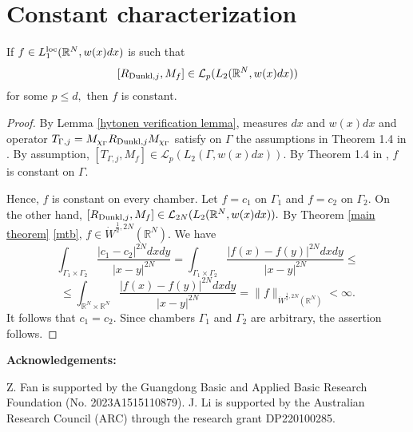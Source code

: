 \documentclass{amsart}
\numberwithin{equation}{section}
\begin{document}
\section{Constant characterization}
\setcounter{equation}{0}

\begin{theorem} If $f\in L_1^{{\rm loc}}(\mathbb{R}^N,w(x)dx)$ is such that $$[R_{{\rm Dunkl},j},M_f]\in\mathcal{L}_p(L_2(\mathbb{R}^N,w(x)dx))$$
for some $p\leq d,$ then $f$ is constant.
\end{theorem}
\begin{proof} By Lemma \ref{hytonen verification lemma}, measures $dx$ and $w(x)dx$ and operator $T_{\Gamma,j}=M_{\chi_{\Gamma}}R_{{\rm Dunkl},j}M_{\chi_{\Gamma}}$ satisfy {\color{red} on $\Gamma$} the assumptions in Theorem 1.4 in \cite{Hytonen-new}. By assumption, $[T_{\Gamma,j},M_f]\in\mathcal{L}_p(L_2(\Gamma,w(x)dx)).$ By Theorem 1.4 in \cite{Hytonen-new}, $f$ is constant on $\Gamma.$

Hence, $f$ is constant on every chamber. Let $f=c_1$ on $\Gamma_1$ and $f=c_2$ on $\Gamma_2.$ On the other hand, $[R_{{\rm Dunkl},j},M_f]\in\mathcal{L}_{2N}(L_2(\mathbb{R}^N,w(x)dx)).$ By Theorem \ref{main theorem} \eqref{mtb}, $f\in\dot{W}^{\frac12,2N}(\mathbb{R}^N).$  We have
$$\int_{\Gamma_1\times\Gamma_2}\frac{|c_1-c_2|^{2N}dxdy}{|x-y|^{2N}}=\int_{\Gamma_1\times\Gamma_2}\frac{|f(x)-f(y)|^{2N}dxdy}{|x-y|^{2N}}\leq$$
$$\leq\int_{\mathbb{R}^N\times\mathbb{R}^N}\frac{|f(x)-f(y)|^{2N}dxdy}{|x-y|^{2N}}=\|f\|_{\dot{W}^{\frac12,2N}(\mathbb{R}^N)}<\infty.$$
It follows that $c_1=c_2.$ Since chambers $\Gamma_1$ and $\Gamma_2$ are arbitrary, the assertion follows.
\end{proof}


 \noindent
 {\bf Acknowledgements:}

Z. Fan is supported by the Guangdong Basic and Applied Basic Research Foundation (No. 2023A1515110879). J. Li is supported by the Australian Research Council (ARC) through the research grant DP220100285.



\end{document}
